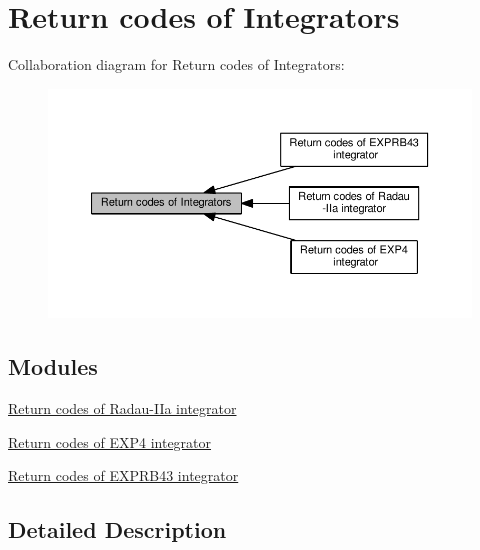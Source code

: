 \hypertarget{group__ErrorCodes}{}\section{Return codes of Integrators}
\label{group__ErrorCodes}
Collaboration diagram for Return codes of Integrators\+:\nopagebreak
\begin{figure}[H]
\begin{center}
\leavevmode
\includegraphics[width=350pt]{group__ErrorCodes}
\end{center}
\end{figure}
\subsection*{Modules}
\begin{DoxyCompactItemize}
\item 
\hyperlink{group__RK__ErrCodes}{Return codes of Radau-\/\+I\+Ia integrator}
\item 
\hyperlink{group__exp4__ErrCodes}{Return codes of E\+X\+P4 integrator}
\item 
\hyperlink{group__exprb43__ErrCodes}{Return codes of E\+X\+P\+R\+B43 integrator}
\end{DoxyCompactItemize}


\subsection{Detailed Description}
